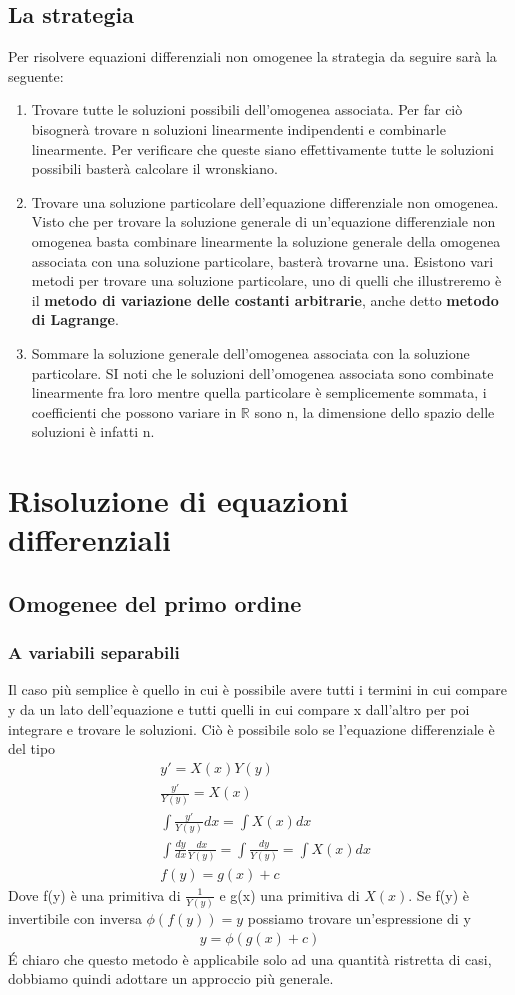 \documentclass[10pt,a4paper]{article}
\begin{document}
\subsection{La strategia}
Per risolvere equazioni differenziali non omogenee la strategia da seguire sarà la seguente:
\begin{enumerate}
	\item Trovare tutte le soluzioni possibili dell'omogenea associata. Per far ciò bisognerà trovare n soluzioni linearmente indipendenti e combinarle linearmente. Per verificare che queste siano effettivamente tutte le soluzioni possibili basterà calcolare il wronskiano. 
	\item Trovare una soluzione particolare dell'equazione differenziale non omogenea. Visto che per trovare la soluzione generale di un'equazione differenziale non omogenea basta combinare linearmente la soluzione generale della omogenea associata con una soluzione particolare, basterà trovarne una. Esistono vari metodi per trovare una soluzione particolare, uno di quelli che illustreremo è il \textbf{metodo di variazione delle costanti arbitrarie}, anche detto \textbf{metodo di Lagrange}.
	\item Sommare la soluzione generale dell'omogenea associata con la soluzione particolare. SI noti che le soluzioni dell'omogenea associata sono combinate linearmente fra loro mentre quella particolare è semplicemente sommata, i coefficienti che possono variare in \(\mathbb{R}\) sono n, la dimensione dello spazio delle soluzioni è infatti n.  
\end{enumerate}
\section{Risoluzione di equazioni differenziali}
\subsection{Omogenee del primo ordine}
\subsubsection{A variabili separabili}
Il caso più semplice è quello in cui è possibile avere tutti i termini in cui compare y da un lato dell'equazione e tutti quelli in cui compare x dall'altro per poi integrare e trovare le soluzioni. Ciò è possibile solo se l'equazione differenziale è del tipo
\begin{align*}
	&y' = X(x)Y(y)\\
	&\frac{y'}{Y(y)} = X(x)\\
	&\int\frac{y'}{Y(y)}dx = \int  X(x) dx\\
	&\int\frac{dy}{dx}\frac{dx}{Y(y)}=\int\frac{dy}{Y(y)}=\int  X(x) dx\\
	&f(y) = g(x) + c
\end{align*} 
Dove f(y) è una primitiva di \(\frac{1}{Y(y)}\) e g(x) una primitiva di \(X(x)\). Se f(y) è invertibile con inversa \(\phi(f(y)) = y\) possiamo trovare un'espressione di y 
\begin{align*}
	y = \phi(g(x)+c)
\end{align*}
\'{E} chiaro che questo metodo è applicabile solo ad una quantità ristretta di casi, dobbiamo quindi adottare un approccio più generale.
\end{document}
